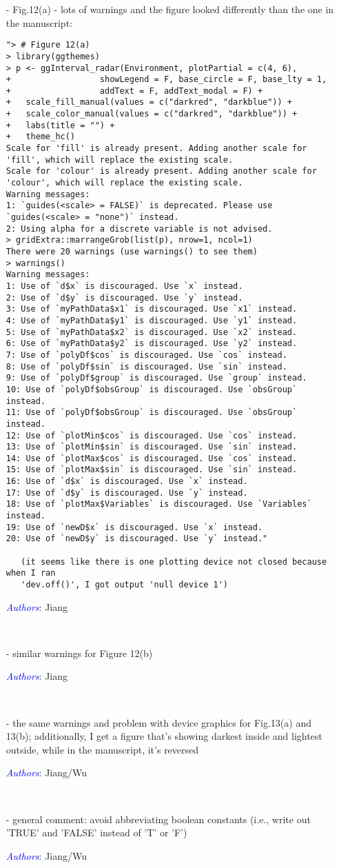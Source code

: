 \documentclass[11pt]{article}
\newcommand{\authors}[1]{

 \parbox{15cm}{\textcolor{blue}{\it Authors}: \color{red}#1}
 \\ \vspace{0.3cm}
}
\begin{document}
\begin{itemize}
\item[-] Fig.12(a) - lots of warnings and the figure looked differently than the one in the manuscript:
\begin{verbatim}
"> # Figure 12(a)
> library(ggthemes)
> p <- ggInterval_radar(Environment, plotPartial = c(4, 6),
+                  showLegend = F, base_circle = F, base_lty = 1,
+                  addText = F, addText_modal = F) +
+   scale_fill_manual(values = c("darkred", "darkblue")) +
+   scale_color_manual(values = c("darkred", "darkblue")) +
+   labs(title = "") +
+   theme_hc()
Scale for 'fill' is already present. Adding another scale for 'fill', which will replace the existing scale.
Scale for 'colour' is already present. Adding another scale for 'colour', which will replace the existing scale.
Warning messages:
1: `guides(<scale> = FALSE)` is deprecated. Please use `guides(<scale> = "none")` instead.
2: Using alpha for a discrete variable is not advised.
> gridExtra::marrangeGrob(list(p), nrow=1, ncol=1)
There were 20 warnings (use warnings() to see them)
> warnings()
Warning messages:
1: Use of `d$x` is discouraged. Use `x` instead.
2: Use of `d$y` is discouraged. Use `y` instead.
3: Use of `myPathData$x1` is discouraged. Use `x1` instead.
4: Use of `myPathData$y1` is discouraged. Use `y1` instead.
5: Use of `myPathData$x2` is discouraged. Use `x2` instead.
6: Use of `myPathData$y2` is discouraged. Use `y2` instead.
7: Use of `polyDf$cos` is discouraged. Use `cos` instead.
8: Use of `polyDf$sin` is discouraged. Use `sin` instead.
9: Use of `polyDf$group` is discouraged. Use `group` instead.
10: Use of `polyDf$obsGroup` is discouraged. Use `obsGroup` instead.
11: Use of `polyDf$obsGroup` is discouraged. Use `obsGroup` instead.
12: Use of `plotMin$cos` is discouraged. Use `cos` instead.
13: Use of `plotMin$sin` is discouraged. Use `sin` instead.
14: Use of `plotMax$cos` is discouraged. Use `cos` instead.
15: Use of `plotMax$sin` is discouraged. Use `sin` instead.
16: Use of `d$x` is discouraged. Use `x` instead.
17: Use of `d$y` is discouraged. Use `y` instead.
18: Use of `plotMax$Variables` is discouraged. Use `Variables` instead.
19: Use of `newD$x` is discouraged. Use `x` instead.
20: Use of `newD$y` is discouraged. Use `y` instead."

   (it seems like there is one plotting device not closed because when I ran
   'dev.off()', I got output 'null device 1')
\end{verbatim}
\authors{Jiang}



\item[-] similar warnings for Figure 12(b)
\authors{Jiang}


\item[-] the same warnings and problem with device graphics for Fig.13(a) and 13(b); additionally, I get a figure that's showing darkest inside and lightest outside, while in the manuscript, it's reversed
\authors{Jiang/Wu}


\item[-] general comment: avoid abbreviating boolean constants (i.e., write out 'TRUE' and 'FALSE' instead of 'T' or 'F')
\authors{Jiang/Wu}
\end{itemize}
\end{document}
